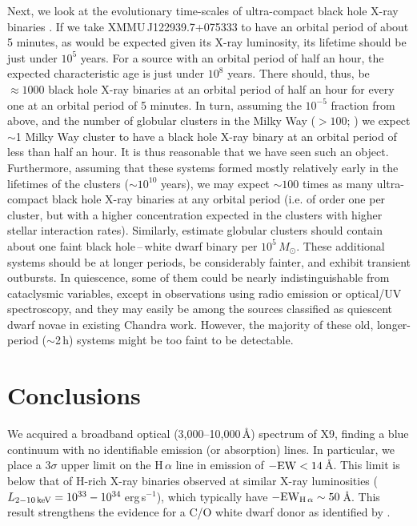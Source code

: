 \documentclass[a4paper,fleqn,usenatbib]{mnras}
\begin{document}
Next, we look at the evolutionary time-scales of ultra-compact black hole X-ray binaries \citep{2012A&A...537A.104V}. If we take XMMU\,J122939.7+075333 to have an orbital period of about 5 minutes, as would be expected given its X-ray luminosity, its lifetime should be just under $10^5$ years. For a source with an orbital period of half an hour, the expected characteristic age is just under $10^8$ years. There should, thus, be $\approx1000$ black hole X-ray binaries at an orbital period of half an hour for every one at an orbital period of 5 minutes. In turn, assuming the $10^{-5}$ fraction from above, and the number of globular clusters in the Milky Way ($> 100$; \citealp{1996AJ....112.1487H}) we expect $\sim$1 Milky Way cluster to have a black hole X-ray binary at an orbital period of less than half an hour. It is thus reasonable that we have seen such an object. Furthermore, assuming that these systems formed mostly relatively early in the lifetimes of the clusters ($\sim 10^{10}$ years), we may expect $\sim100$ times as many ultra-compact black hole X-ray binaries at any orbital period (i.e. of order one per cluster, but with a higher concentration expected in the clusters with higher stellar interaction rates). Similarly, \citet{2017ApJ...843L..30I} estimate globular clusters should contain about one faint black hole\,--\,white dwarf binary per $10^5\,M_\odot$. These additional systems should be at longer periods, be considerably fainter, and exhibit transient outbursts. In quiescence, some of them could be nearly indistinguishable from cataclysmic variables, except in observations using radio emission or optical/UV spectroscopy, and they may easily be among the sources classified as quiescent dwarf novae in existing Chandra work. However, the majority of these old, longer-period ($\sim$2\,h) systems might be too faint to be detectable.

\section{Conclusions}

We acquired a broadband optical (3,000--10,000\,{\AA}) spectrum of X9, finding a blue continuum with no identifiable emission (or absorption) lines. In particular, we place a $3\sigma$ upper limit on the H\,$\alpha$ line in emission of $\rm -EW < 14$\,{\AA}. This limit is below that of H-rich X-ray binaries observed at similar X-ray luminosities ($L_{\rm 2-10\,keV} = 10^{33}-10^{34}$\,erg\,s$^{-1}$), which typically have $\rm -EW_{H\,\alpha} \sim 50$\,{\AA}. This result strengthens the evidence for a C/O white dwarf donor as identified by \citet{2017MNRAS.467.2199B}.
\end{document}
